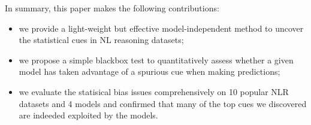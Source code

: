 In summary, this paper makes the following contributions:
\begin{itemize}
\item we provide a light-weight but effective model-independent method to 
uncover the statistical cues in NL reasoning datasets;

\item we propose a simple blackbox test to quantitatively 
assess whether a given model has taken advantage of a
spurious cue when making predictions;

\item we evaluate the statisical bias issues comprehensively on
10 popular NLR datasets and 4 models and confirmed that many of the
top cues we discovered are indeeded exploited by the models.
\end{itemize}








